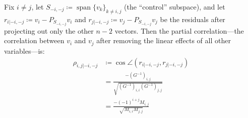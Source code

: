 \documentclass{IEEEtran}
\begin{document}
\begin{proposition}
  \label{prop:partial-corr}
  Fix $i \neq j$, let $S_{-i,-j} \coloneq \operatorname{span}\{v_{k}\}_{k \neq i,j}$ (the ``control'' subspace), and let $r_{i|-i,-j} \coloneq v_{i} - P_{S_{-i,-j}} v_{i}$ and $r_{j|-i,-j} \coloneq v_{j} - P_{S_{-i,-j}} v_{j}$ be the residuals after projecting out only the other $n-2$ vectors. Then the partial correlation---the correlation between $v_{i}$ and $v_{j}$ after removing the linear effects of all other variables---is:
  \begin{equation} \label{eq:partial-corr}
    \begin{aligned}
      \rho_{i,j |-i,-j}
      &\coloneq \cos\angle(r_{i|-i,-j}, r_{j|-i,-j}) \\
      &= \frac{-(G^{-1})_{i,j}}{\sqrt{(G^{-1})_{i,i}(G^{-1})_{j,j}}} \\
      &= \frac{-(-1)^{i+j} M_{i,j}}{\sqrt{M_{i,i} M_{j,j}}}
    \end{aligned}
  \end{equation}
\end{proposition}
\end{document}

